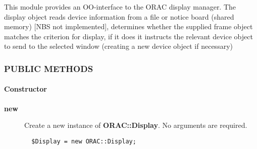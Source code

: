This module provides an OO-interface to the ORAC display manager.  The
display object reads device information from a file or notice board
(shared memory) [NBS not implemented], determines whether the supplied
frame object matches the criterion for display, if it does it
instructs the relevant device object to send to the selected window
(creating a new device object if necessary)

\subsubsection*{PUBLIC METHODS\label{ORAC::Display_PUBLIC_METHODS}}\paragraph*{Constructor\label{ORAC::Display_Constructor}}\begin{description}
\item[\textbf{new}] \mbox{}

Create a new instance of \textbf{ORAC::Display}. No arguments are
required.

\begin{verbatim}
  $Display = new ORAC::Display;
\end{verbatim}
\end{description}
